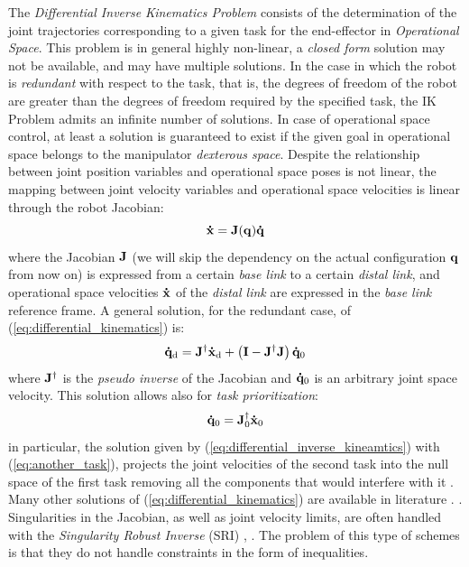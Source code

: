 The \emph{Differential Inverse Kinematics Problem} consists of the determination of the joint trajectories corresponding to a given task for the end-effector in \emph{Operational Space}. This problem is in general highly non-linear, a \emph{closed form} solution may not be available, and may have multiple solutions. In the case in which the robot is \emph{redundant} with respect to the task, that is, the degrees of freedom of the robot are greater than the degrees of freedom required by the specified task,  the IK Problem admits an infinite number of solutions. In case of operational space control, at least a solution is guaranteed to exist if the given goal in operational space belongs to the manipulator \emph{dexterous space}.
Despite the relationship between joint position variables and operational space poses is not linear, the mapping between joint velocity variables and operational space velocities is linear through the robot Jacobian:
\begin{equation}
    \label{eq:differential_kinematics}
    \mathbf{\dot{x}} = \mathbf{J}(\mathbf{q})\mathbf{\dot{q}}
\end{equation}
where the Jacobian $\mathbf{J}$ (we will skip the dependency on the actual configuration $\mathbf{q}$ from now on) is expressed from a certain \emph{base link} to a certain \emph{distal link}, and operational space velocities $\mathbf{\dot{x}}$ of the \emph{distal link} are expressed in the \emph{base link} reference frame.
A general solution, for the redundant case, of (\ref{eq:differential_kinematics}) is:
\begin{equation}
    \label{eq:differential_inverse_kineamtics}
    \mathbf{\dot{q}}_\text{d} = \mathbf{J}^{\dagger}\mathbf{\dot{x}}_\text{d} + \left( \mathbf{I} - \mathbf{J}^{\dagger}\mathbf{J} \right)\mathbf{\dot{q}}_\text{0}
\end{equation}
where $\mathbf{J}^{\dagger}$ is the \emph{pseudo inverse} of the Jacobian and $\mathbf{\dot{q}}_\text{0}$ is an arbitrary joint space velocity. 
This solution allows also for \emph{task prioritization}: 
\begin{equation}
    \label{eq:another_task}
\mathbf{\dot{q}}_\text{0} = \mathbf{J}_\text{0}^{\dagger}\mathbf{\dot{x}}_\text{0}
\end{equation}
in particular, the solution given by (\ref{eq:differential_inverse_kineamtics}) with (\ref{eq:another_task}), projects the joint velocities of the second task into the null space of the first task removing all the components that would interfere with it \cite{DBLPReferenceRobo2008}. Many other solutions of (\ref{eq:differential_kinematics}) are available in literature \cite{siciliano1991general}. . Singularities in the Jacobian, as well as joint velocity limits, are often handled with the \emph{Singularity Robust Inverse} (SRI) \cite{nakamura1990-tp}, \cite{maciejewski1989-jp}.
The problem of this type of schemes is that they do not handle constraints in the form of inequalities. 


